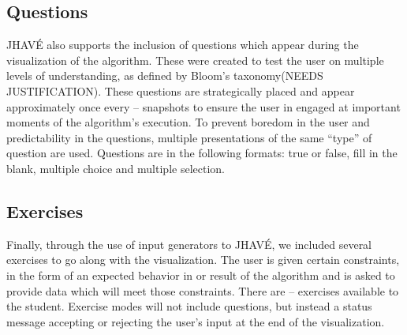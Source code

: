 \documentclass{acm_proc_article-sp}
\begin{document}
\subsection{Questions}
JHAVÉ also supports the inclusion of questions which appear during the visualization of the algorithm.
These were created to test the user on multiple levels of understanding, as defined by Bloom's taxonomy(NEEDS JUSTIFICATION).
These questions are strategically placed and appear approximately once every -- snapshots to ensure the user in engaged at important moments of the algorithm's execution.
To prevent boredom in the user and predictability in the questions, multiple presentations of the same ``type'' of question are used.
Questions are in the following formats: true or false, fill in the blank, multiple choice and multiple selection.
\subsection{Exercises}%
Finally, through the use of input generators to JHAVÉ, we included several exercises to go along with the visualization.
The user is given certain constraints, in the form of an expected behavior in or result of the algorithm and is asked to provide data which will meet those constraints.
There are -- exercises available to the student.
Exercise modes will not include questions, but instead a status message accepting or rejecting the user's input at the end of the visualization.

\printbibliography

\balancecolumns
\end{document}
